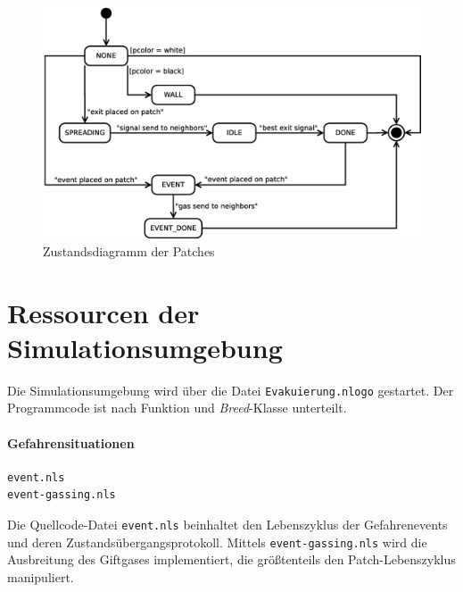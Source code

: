 

\begin{figure}[!ht]
\centering
\includegraphics[height=0.6\textwidth]{simulationsumgebung/patch.eps}
\caption{Zustandsdiagramm der Patches}
\label{fig:patch}
\end{figure}


\section{Ressourcen der Simulationsumgebung}
\label{sec:ressourcen}

Die Simulationsumgebung wird über die Datei \verb|Evakuierung.nlogo| gestartet. Der Programmcode ist nach Funktion und \emph{Breed}-Klasse unterteilt.

\paragraph{Gefahrensituationen} 

\begin{verbatim}
event.nls
event-gassing.nls
\end{verbatim}

Die Quellcode-Datei \verb|event.nls| beinhaltet den Lebenszyklus der Gefahrenevents und deren Zustandsübergangsprotokoll. Mittels \verb|event-gassing.nls| wird die Ausbreitung des Giftgases implementiert, die größtenteils den Patch-Lebenszyklus manipuliert.

